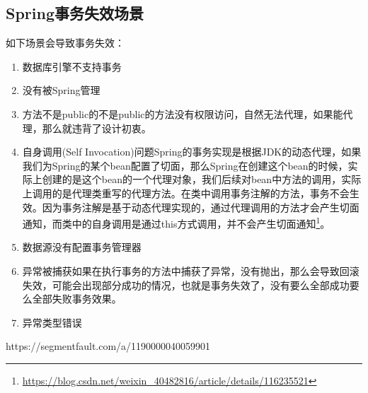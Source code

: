\documentclass[../../../interview-questions.tex]{subfiles}
\begin{document}
\subsection{Spring事务失效场景}

如下场景会导致事务失效：

\begin{enumerate}
    \item {数据库引擎不支持事务}
    \item {没有被Spring管理}
    \item {方法不是public的}不是public的方法没有权限访问，自然无法代理，如果能代理，那么就违背了设计初衷。
    \item {自身调用(Self Invocation)问题}Spring的事务实现是根据JDK的动态代理，如果我们为Spring的某个bean配置了切面，那么Spring在创建这个bean的时候，实际上创建的是这个bean的一个代理对象，我们后续对bean中方法的调用，实际上调用的是代理类重写的代理方法。在类中调用事务注解的方法，事务不会生效。因为事务注解是基于动态代理实现的，通过代理调用的方法才会产生切面通知，而类中的自身调用是通过this方式调用，并不会产生切面通知\footnote{\url{https://blog.csdn.net/weixin_40482816/article/details/116235521}}。
    \item {数据源没有配置事务管理器}
    \item {异常被捕获}如果在执行事务的方法中捕获了异常，没有抛出，那么会导致回滚失效，可能会出现部分成功的情况，也就是事务失效了，没有要么全部成功要么全部失败事务效果。
    \item {异常类型错误}
\end{enumerate}

https://segmentfault.com/a/1190000040059901
\end{document}
